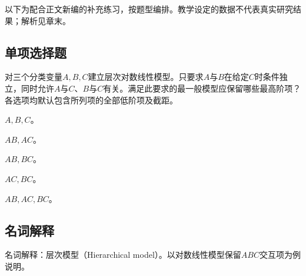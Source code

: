 \begin{keyidea}[说明]以下为配合正文新编的补充练习，按题型编排。教学设定的数据不代表真实研究结果；解析见章末。\end{keyidea}

\par\addvspace{8pt}\noindent\begin{minipage}{\linewidth}

\subsection{单项选择题}


对三个分类变量\(A,B,C\)建立层次对数线性模型。只要求\(A\)与\(B\)在给定\(C\)时条件独立，同时允许\(A\)与\(C\)、\(B\)与\(C\)有关。满足此要求的最一般模型应保留哪些最高阶项？各选项均默认包含所列项的全部低阶项及截距。

\begin{choices}

\item \(A,B,C\)。

\item \(AB,AC\)。

\item \(AB,BC\)。

\item \(AC,BC\)。

\item \(AB,AC,BC\)。

\end{choices}

\end{minipage}\par\vspace{5pt}

\par\addvspace{8pt}\noindent\begin{minipage}{\linewidth}

\subsection{名词解释}


名词解释：层次模型（Hierarchical model）。以对数线性模型保留\(ABC\)交互项为例说明。


\end{minipage}\par\vspace{5pt}

